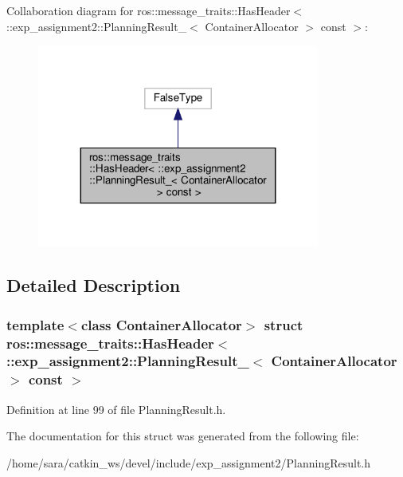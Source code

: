 Collaboration diagram for ros\+:\+:message\+\_\+traits\+:\+:Has\+Header$<$ \+:\+:exp\+\_\+assignment2\+:\+:Planning\+Result\+\_\+$<$ Container\+Allocator $>$ const $>$\+:
\nopagebreak
\begin{figure}[H]
\begin{center}
\leavevmode
\includegraphics[width=263pt]{structros_1_1message__traits_1_1HasHeader_3_01_1_1exp__assignment2_1_1PlanningResult___3_01Contaafe4d94e178f6566ef7d30a1332e139a}
\end{center}
\end{figure}


\subsection{Detailed Description}
\subsubsection*{template$<$class Container\+Allocator$>$\newline
struct ros\+::message\+\_\+traits\+::\+Has\+Header$<$ \+::exp\+\_\+assignment2\+::\+Planning\+Result\+\_\+$<$ Container\+Allocator $>$ const $>$}



Definition at line 99 of file Planning\+Result.\+h.



The documentation for this struct was generated from the following file\+:\begin{DoxyCompactItemize}
\item 
/home/sara/catkin\+\_\+ws/devel/include/exp\+\_\+assignment2/Planning\+Result.\+h\end{DoxyCompactItemize}
